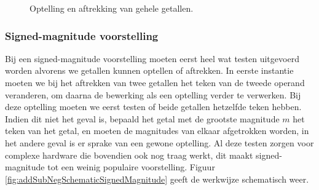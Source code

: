 \begin{figure}[hbt]
{
\label{fig:addSubNegSchematicOneComplement}}
\caption{Optelling en aftrekking van gehele getallen.}
\label{fig:addSubNegSchematic}
\end{figure}
\subsubsection{Signed-magnitude voorstelling}
Bij een signed-magnitude voorstelling moeten eerst heel wat testen uitgevoerd worden alvorens we getallen kunnen optellen of aftrekken. In eerste instantie moeten we bij het aftrekken van twee getallen het teken van de tweede operand veranderen, om daarna de bewerking als een optelling verder te verwerken. Bij deze optelling moeten we eerst testen of beide getallen hetzelfde teken hebben. Indien dit niet het geval is, bepaald het getal met de grootste magnitude $m$ het teken van het getal, en moeten de magnitudes van elkaar afgetrokken worden, in het andere geval is er sprake van een gewone optelling. Al deze testen zorgen voor complexe hardware die bovendien ook nog traag werkt, dit maakt signed-magnitude tot een weinig populaire voorstelling. Figuur \ref{fig:addSubNegSchematicSignedMagnitude} geeft de werkwijze schematisch weer.
